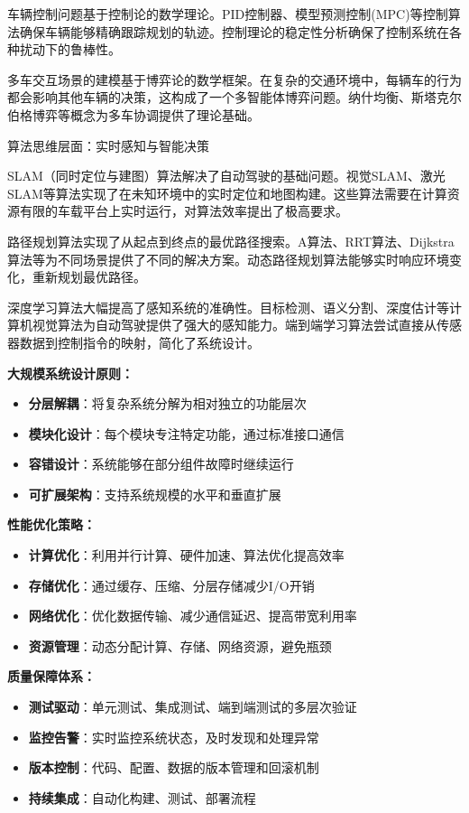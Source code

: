 车辆控制问题基于控制论的数学理论。PID控制器、模型预测控制(MPC)等控制算法确保车辆能够精确跟踪规划的轨迹。控制理论的稳定性分析确保了控制系统在各种扰动下的鲁棒性。

多车交互场景的建模基于博弈论的数学框架。在复杂的交通环境中，每辆车的行为都会影响其他车辆的决策，这构成了一个多智能体博弈问题。纳什均衡、斯塔克尔伯格博弈等概念为多车协调提供了理论基础。

算法思维层面：实时感知与智能决策

SLAM（同时定位与建图）算法解决了自动驾驶的基础问题。视觉SLAM、激光SLAM等算法实现了在未知环境中的实时定位和地图构建。这些算法需要在计算资源有限的车载平台上实时运行，对算法效率提出了极高要求。

路径规划算法实现了从起点到终点的最优路径搜索。A算法、RRT算法、Dijkstra算法等为不同场景提供了不同的解决方案。动态路径规划算法能够实时响应环境变化，重新规划最优路径。

深度学习算法大幅提高了感知系统的准确性。目标检测、语义分割、深度估计等计算机视觉算法为自动驾驶提供了强大的感知能力。端到端学习算法尝试直接从传感器数据到控制指令的映射，简化了系统设计。

\begin{tcolorbox}[colback=green!5!white,colframe=green!75!black,title=方法要点：工程实现的系统性方法]
\textbf{大规模系统设计原则：}
\begin{itemize}
\item \textbf{分层解耦}：将复杂系统分解为相对独立的功能层次
\item \textbf{模块化设计}：每个模块专注特定功能，通过标准接口通信
\item \textbf{容错设计}：系统能够在部分组件故障时继续运行
\item \textbf{可扩展架构}：支持系统规模的水平和垂直扩展
\end{itemize}

\textbf{性能优化策略：}
\begin{itemize}
\item \textbf{计算优化}：利用并行计算、硬件加速、算法优化提高效率
\item \textbf{存储优化}：通过缓存、压缩、分层存储减少I/O开销
\item \textbf{网络优化}：优化数据传输、减少通信延迟、提高带宽利用率
\item \textbf{资源管理}：动态分配计算、存储、网络资源，避免瓶颈
\end{itemize}

\textbf{质量保障体系：}
\begin{itemize}
\item \textbf{测试驱动}：单元测试、集成测试、端到端测试的多层次验证
\item \textbf{监控告警}：实时监控系统状态，及时发现和处理异常
\item \textbf{版本控制}：代码、配置、数据的版本管理和回滚机制
\item \textbf{持续集成}：自动化构建、测试、部署流程
\end{itemize}
\end{tcolorbox}

